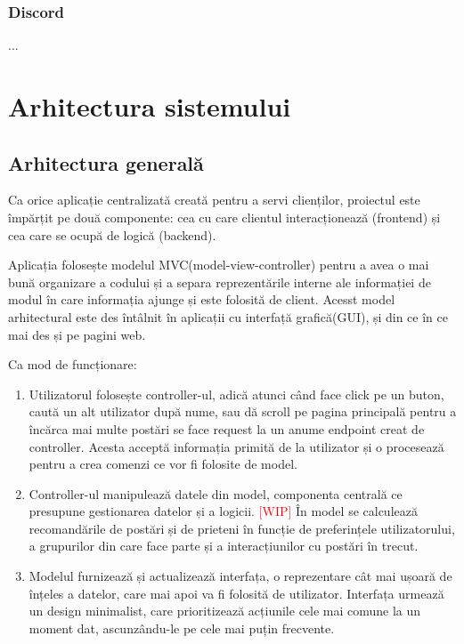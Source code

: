 \documentclass{article}
\begin{document}
        \subsubsection{Discord}
        \label{Soluții similare Discord}
        ...
\newpage
\section{Arhitectura sistemului}
\label{Arhitectura sistemului}
    \subsection{Arhitectura generală}
    \label{Arhitectura generală}
    Ca orice aplicație centralizată creată pentru a servi clienților, proiectul este împărțit pe două componente: cea cu care clientul interacționează (frontend) și cea care se ocupă de logică (backend).

    Aplicația folosește modelul MVC(model-view-controller) pentru a avea o mai bună organizare a codului și a separa reprezentările interne ale informației de modul în care informația ajunge și este folosită de client. Acesst model arhitectural este des întâlnit în aplicații cu interfață grafică(GUI), și din ce în ce mai des și pe pagini web. 
    
    Ca mod de funcționare:
    \begin{enumerate}[noitemsep, label=\textbullet]
        \item Utilizatorul folosește controller-ul, adică atunci când face click pe un buton, caută un alt utilizator după nume, sau dă scroll pe pagina principală pentru a încărca mai multe postări se face request la un anume endpoint creat de controller. Acesta acceptă informația primită de la utilizator și o procesează pentru a crea comenzi ce vor fi folosite de model.
        \item Controller-ul manipulează datele din model, componenta centrală ce presupune gestionarea datelor și a logicii. \textcolor{red}{[WIP]} În model se calculează recomandările de postări și de prieteni în funcție de preferințele utilizatorului, a grupurilor din care face parte și a interacțiunilor cu postări în trecut.
        \item Modelul furnizează și actualizează interfața, o reprezentare cât mai ușoară de înțeles a datelor, care mai apoi va fi folosită de utilizator. Interfața urmează un design minimalist, care prioritizează acțiunile cele mai comune la un moment dat, ascunzându-le pe cele mai puțin frecvente. 
    \end{enumerate}
    
\end{document}
